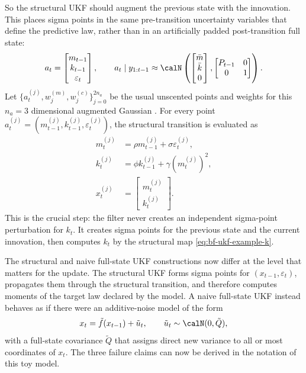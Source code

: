 So the structural UKF should augment the previous state with the innovation.
This places sigma points in the same pre-transition uncertainty variables that
define the predictive law, rather than in an artificially padded post-transition
full state:
\begin{equation}
  a_t =
  \begin{bmatrix}
    m_{t-1}\\ k_{t-1}\\ \varepsilon_t
  \end{bmatrix},
  \qquad
  a_t\mid y_{1:t-1}
  \approx
  \calN\left(
    \begin{bmatrix}\bar m\\ \bar k\\ 0\end{bmatrix},
    \begin{bmatrix}
      P_{t-1} & 0\\
      0 & 1
    \end{bmatrix}
  \right).
  \label{eq:bf-ukf-augmented-law}
\end{equation}
Let $\{a_t^{(j)},w_j^{(m)},w_j^{(c)}\}_{j=0}^{2n_a}$ be the usual unscented
points and weights for this $n_a=3$ dimensional augmented Gaussian
\citep{julier1997new}.  For every point
$a_t^{(j)}=(m_{t-1}^{(j)},k_{t-1}^{(j)},\varepsilon_t^{(j)})$, the structural
transition is evaluated as
\begin{align}
  m_t^{(j)}
    &= \rho m_{t-1}^{(j)}+\sigma\varepsilon_t^{(j)},\\
  k_t^{(j)}
    &= \phi k_{t-1}^{(j)}+\gamma\left(m_t^{(j)}\right)^2,\\
  x_t^{(j)}
    &= \begin{bmatrix}m_t^{(j)}\\ k_t^{(j)}\end{bmatrix}.
\end{align}
This is the crucial step: the filter never creates an independent sigma-point
perturbation for $k_t$.  It creates sigma points for the previous state and
the current innovation, then computes $k_t$ by the structural map
\eqref{eq:bf-ukf-example-k}.

The structural and naive full-state UKF constructions now differ at the level
that matters for the update.  The structural UKF forms sigma points for
$(x_{t-1},\varepsilon_t)$, propagates them through the structural transition,
and therefore computes moments of the target law declared by the model.  A
naive full-state UKF instead behaves as if there were an additive-noise model
of the form
\[
  x_t = \tilde f(x_{t-1}) + \tilde u_t,
  \qquad
  \tilde u_t \sim \calN(0,\tilde Q),
\]
with a full-state covariance $\tilde Q$ that assigns direct new variance to all
or most coordinates of $x_t$.  The three failure claims can now be derived in
the notation of this toy model.

